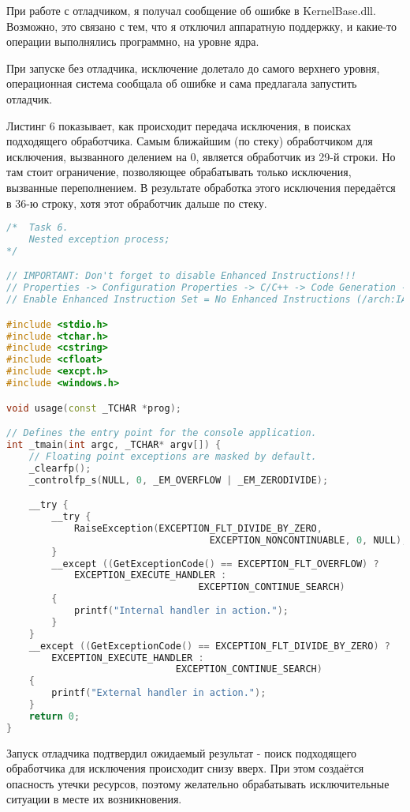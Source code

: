 \documentclass[a4paper,12pt]{article} %
\begin{document}
При работе с отладчиком, я получал сообщение об ошибке в KernelBase.dll. Возможно, это связано с тем, что я отключил аппаратную поддержку, и какие-то операции выполнялись программно, на уровне ядра.

При запуске без отладчика, исключение долетало до самого верхнего уровня, операционная система сообщала об ошибке и сама предлагала запустить отладчик.
\newpage

Листинг 6 показывает, как происходит передача исключения, в поисках подходящего обработчика. Самым ближайшим (по стеку) обработчиком для исключения, вызванного делением на 0, является обработчик из 29-й строки. Но там стоит ограничение, позволяющее обрабатывать только исключения, вызванные переполнением. В результате обработка этого исключения передаётся в 36-ю строку, хотя этот обработчик дальше по стеку.

\begin{lstlisting}[language=C++, caption={Вложенные исключения}]
/*  Task 6.
	Nested exception process;
*/

// IMPORTANT: Don't forget to disable Enhanced Instructions!!!
// Properties -> Configuration Properties -> C/C++ -> Code Generation ->
// Enable Enhanced Instruction Set = No Enhanced Instructions (/arch:IA32)

#include <stdio.h>
#include <tchar.h>
#include <cstring>
#include <cfloat>
#include <excpt.h>
#include <windows.h>

void usage(const _TCHAR *prog);

// Defines the entry point for the console application.
int _tmain(int argc, _TCHAR* argv[]) {
	// Floating point exceptions are masked by default.
	_clearfp();
	_controlfp_s(NULL, 0, _EM_OVERFLOW | _EM_ZERODIVIDE);

	__try {
		__try {
			RaiseException(EXCEPTION_FLT_DIVIDE_BY_ZERO,
									EXCEPTION_NONCONTINUABLE, 0, NULL);
		}
		__except ((GetExceptionCode() == EXCEPTION_FLT_OVERFLOW) ?
			EXCEPTION_EXECUTE_HANDLER :
								  EXCEPTION_CONTINUE_SEARCH)
		{
			printf("Internal handler in action.");
		}
	}
	__except ((GetExceptionCode() == EXCEPTION_FLT_DIVIDE_BY_ZERO) ?
		EXCEPTION_EXECUTE_HANDLER :
							  EXCEPTION_CONTINUE_SEARCH)
	{
		printf("External handler in action.");
	}
	return 0;
}
\end{lstlisting}

Запуск отладчика подтвердил ожидаемый результат - поиск подходящего обработчика для исключения происходит снизу вверх. При этом создаётся опасность утечки ресурсов, поэтому желательно обрабатывать исключительные ситуации в месте их возникновения.
\newpage
\end{document}
